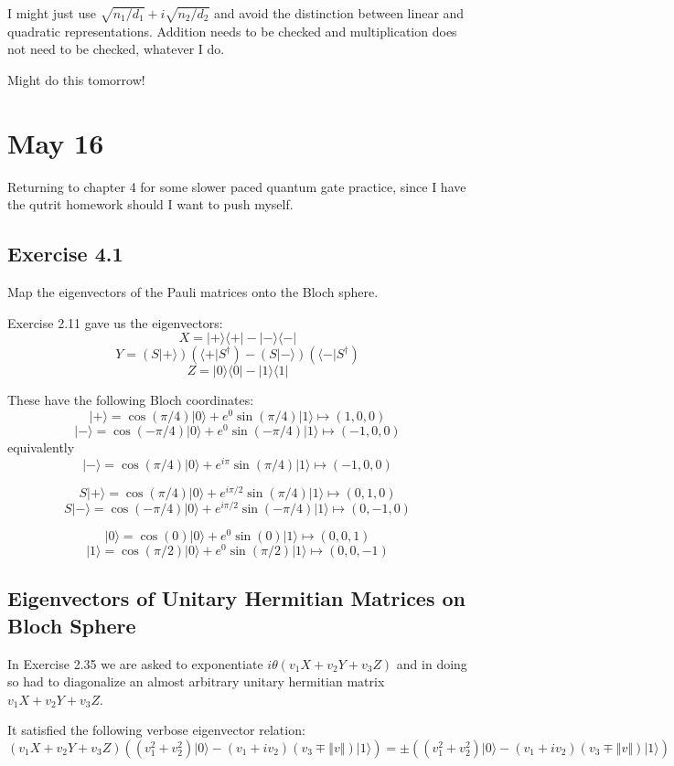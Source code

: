 \documentclass[]{article}
\newcommand{\bra}[1]{\langle #1 |}
\newcommand{\ket}[1]{| #1 \rangle}
\newcommand{\norm}[1]{\left\Vert #1 \right\Vert}
\begin{document}
I might just use $\sqrt{n_1/d_1} + i\sqrt{n_2/d_2}$ and avoid the distinction between linear and quadratic representations. Addition needs to be checked and multiplication does not need to be checked, whatever I do.

Might do this tomorrow!

\section{May 16}

Returning to chapter 4 for some slower paced quantum gate practice, since I have the qutrit homework should I want to push myself.

\subsection{Exercise 4.1}
Map the eigenvectors of the Pauli matrices onto the Bloch sphere.

Exercise 2.11 gave us the eigenvectors:
\[
X = \ket{+}\bra{+} - \ket{-}\bra{-}
\]
\[Y = (S\ket{+})(\bra{+}S^\dagger) - (S\ket{-})(\bra{-}S^\dagger)\]
\[Z = \ket{0}\bra{0} - \ket{1}\bra{1}\]

These have the following Bloch coordinates:
\[
\ket{+} = \cos(\pi/4)\ket{0} + e^0\sin(\pi/4)\ket{1} \mapsto (1, 0, 0)
\]
\[
\ket{-} = \cos(-\pi/4)\ket{0} + e^0\sin(-\pi/4)\ket{1} \mapsto (-1, 0, 0)
\]
equivalently
\[
\ket{-} = \cos(\pi/4)\ket{0} + e^{i\pi}\sin(\pi/4)\ket{1} \mapsto (-1, 0, 0)
\]

\[S\ket{+} = \cos(\pi/4)\ket{0} + e^{i\pi/2}\sin(\pi/4)\ket{1} \mapsto (0, 1, 0)\]
\[S\ket{-} = \cos(-\pi/4)\ket{0} + e^{i\pi/2}\sin(-\pi/4)\ket{1} \mapsto (0, -1, 0)\]

\[\ket{0} = \cos(0)\ket{0} + e^0\sin(0)\ket{1} \mapsto (0, 0, 1)\]
\[\ket{1} = \cos(\pi/2)\ket{0} + e^0\sin(\pi/2)\ket{1} \mapsto (0, 0, -1)\]

\subsection{Eigenvectors of Unitary Hermitian Matrices on Bloch Sphere}

In Exercise 2.35 we are asked to exponentiate $i\theta(v_1X+v_2Y+v_3Z)$ and in doing so had to diagonalize an almost arbitrary unitary hermitian matrix $v_1X+v_2Y+v_3Z$.

It satisfied the following verbose eigenvector relation:
\[(v_1X+v_2Y+v_3Z)((v_1^2+v_2^2)\ket{0} - (v_1+iv_2)(v_3\mp \norm{v})\ket{1}) = \pm ((v_1^2+v_2^2)\ket{0} - (v_1+iv_2)(v_3\mp \norm{v})\ket{1})\]
\end{document}
